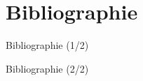 \documentclass[svgnames,11pt,aspectratio=169]{beamer}
\newcommand{\partlabel}{}
\begin{document}
\section*{Bibliographie}\gdef\partlabel{Références}

\begin{frame}{Bibliographie (1/2)}
\fontsize{9}{11}\selectfont\setlength{\parskip}{0pt}
\begin{itemize}
\setlength{\itemsep}{.22cm}
\end{itemize}
\end{frame}

\begin{frame}{Bibliographie (2/2)}
\fontsize{9}{11}\selectfont\setlength{\parskip}{0pt}
\begin{itemize}
\setlength{\itemsep}{.20cm}
\end{itemize}
\end{frame}
\end{document}
